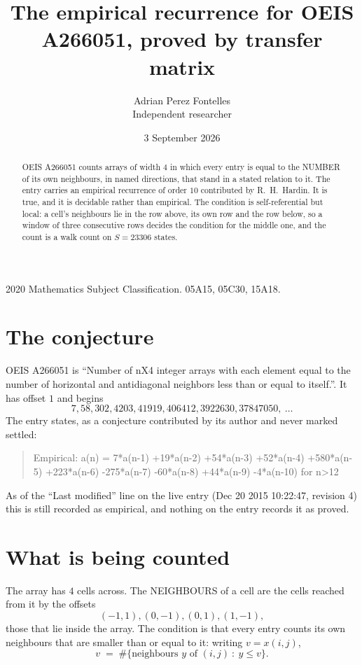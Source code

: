 \documentclass[11pt,a4paper]{article}
\title{The empirical recurrence for OEIS A266051, proved by transfer matrix}
\author{Adrian Perez Fontelles\\ \small Independent researcher}
\date{3 September 2026}
\theoremstyle{plain}
\theoremstyle{definition}
\begin{document}
\maketitle

\begin{abstract}
OEIS A266051 counts arrays of width $4$ in which every entry is equal to the NUMBER of its own
neighbours, in named directions, that stand in a stated relation to it. The entry carries an
empirical recurrence of order $10$ contributed by R.~H.~Hardin. It is true, and it is
decidable rather than empirical. The condition is self-referential but local: a cell's
neighbours lie in the row above, its own row and the row below, so a window of three
consecutive rows decides the condition for the middle one, and the count is a walk count on
$S=23306$ states.
\end{abstract}

\noindent\small 2020 Mathematics Subject Classification. 05A15, 05C30, 15A18.\normalsize

\section{The conjecture}

OEIS A266051 is ``Number of nX4 integer arrays with each element equal to the number of horizontal and antidiagonal neighbors less than or equal to itself.''. It has offset $1$ and begins
\[
7, 58, 302, 4203, 41919, 406412, 3922630, 37847050,\ \dots
\]
The entry states, as a conjecture contributed by its author and never marked settled:
\begin{quote}
Empirical: a(n) = 7*a(n-1) +19*a(n-2) +54*a(n-3) +52*a(n-4) +580*a(n-5) +223*a(n-6) -275*a(n-7) -60*a(n-8) +44*a(n-9) -4*a(n-10) for n>12
\end{quote}
As of the ``Last modified'' line on the live entry (Dec 20 2015 10:22:47, revision 4) this is still
recorded as empirical, and nothing on the entry records it as proved.

\section{What is being counted}

The array has $4$ cells across. The NEIGHBOURS of a cell are the cells reached from it by the
offsets
\[
(-1,1), (0,-1), (0,1), (1,-1),
\]
those that lie inside the array. The condition is that every entry counts its own neighbours
that are smaller than or equal to it: writing $v=x(i,j)$,
\[
v\;=\;\#\{\text{neighbours } y \text{ of } (i,j)\ :\ y\le v\} .
\]
\end{document}
